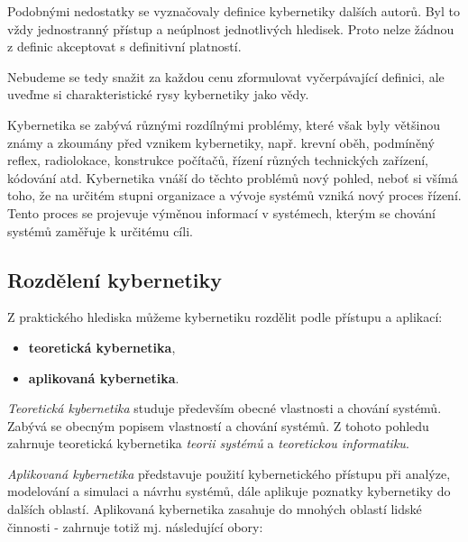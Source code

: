 {      Podobnými nedostatky se vyznačovaly definice kybernetiky dalších autorů. Byl to vždy 
      jednostranný přístup a neúplnost jednotlivých hledisek. Proto nelze žádnou z definic 
      akceptovat s definitivní platností.
      
      Nebudeme se tedy snažit za každou cenu zformulovat vyčerpávající definici, ale uveďme si 
      charakteristické rysy kybernetiky jako vědy.
      
      Kybernetika se zabývá různými rozdílnými problémy, které však byly většinou známy a zkoumány 
      před vznikem kybernetiky, např. krevní oběh, podmíněný reflex, radiolokace, konstrukce 
      počítačů, řízení různých technických zařízení, kódování atd. Kybernetika vnáší do těchto 
      problémů nový pohled, neboť si všímá toho, že na určitém stupni organizace a vývoje systémů 
      vzniká nový proces řízení. Tento proces se projevuje výměnou informací v systémech, kterým se 
      chování systémů zaměřuje k určitému cíli.
      
    \subsection{Rozdělení kybernetiky}
      Z praktického hlediska můžeme kybernetiku rozdělit podle přístupu a aplikací:
      \begin{itemize}\addtolength{\itemsep}{-0.5\baselineskip}
        \item \textbf{teoretická kybernetika},
        \item \textbf{aplikovaná kybernetika}.
      \end{itemize}

      \emph{Teoretická kybernetika} studuje především obecné vlastnosti a chování systémů. Zabývá 
      se obecným popisem vlastností a chování systémů. Z tohoto pohledu zahrnuje teoretická 
      kybernetika \emph{teorii systémů} a \emph{teoretickou informatiku}.
      
      \emph{Aplikovaná kybernetika} představuje použití kybernetického přístupu při analýze, 
      modelování a simulaci a návrhu systémů, dále aplikuje poznatky kybernetiky do dalších 
      oblastí. Aplikovaná kybernetika zasahuje do mnohých oblastí lidské činnosti - zahrnuje totiž 
      mj. následující obory:
      
}
